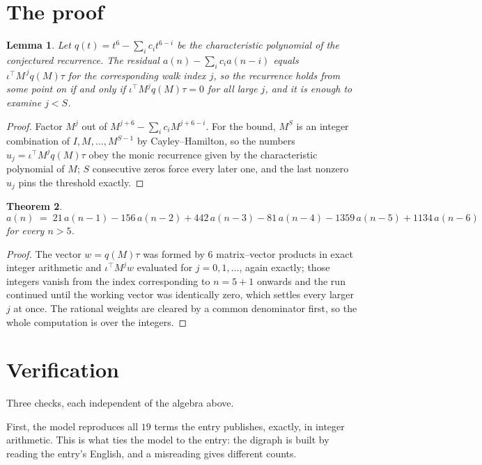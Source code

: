 \documentclass[11pt,a4paper]{article}
\theoremstyle{plain}
\newtheorem{theorem}{Theorem}
\newtheorem{lemma}[theorem]{Lemma}
\theoremstyle{definition}
\begin{document}
\section{The proof}

\begin{lemma}\label{lem:crit}
Let $q(t)=t^{6}-\sum_i c_it^{6-i}$ be the characteristic polynomial of the
conjectured recurrence. The residual $a(n)-\sum_ic_ia(n-i)$ equals
$\iota^{\!\top}M^{\,j}q(M)\tau$ for the corresponding walk index $j$, so the recurrence
holds from some point on if and only if $\iota^{\!\top}M^{j}q(M)\tau=0$ for all large $j$,
and it is enough to examine $j<S$.
\end{lemma}

\begin{proof}
Factor $M^{j}$ out of $M^{j+6}-\sum_ic_iM^{j+6-i}$. For the bound, $M^{S}$
is an integer combination of $I,M,\dots,M^{S-1}$ by Cayley--Hamilton, so the numbers
$u_j=\iota^{\!\top}M^{j}q(M)\tau$ obey the monic recurrence given by the characteristic
polynomial of $M$; $S$ consecutive zeros force every later one, and the last nonzero $u_j$
pins the threshold exactly.
\end{proof}

\begin{theorem}
\[
a(n)\;=\;21\,a(n-1) - 156\,a(n-2) + 442\,a(n-3) - 81\,a(n-4) - 1359\,a(n-5) + 1134\,a(n-6)
\]
for every $n>5$.
\end{theorem}

\begin{proof}
The vector $w=q(M)\tau$ was formed by $6$ matrix--vector products in exact integer
arithmetic and $\iota^{\!\top}M^{j}w$ evaluated for $j=0,1,\dots$, again exactly; those
integers vanish from the index corresponding to $n=5+1$ onwards and the run continued
until the working vector was identically zero, which settles every larger $j$ at once. The
rational weights are cleared by a common denominator first, so the whole computation is over
the integers.
\end{proof}

\section{Verification}

Three checks, each independent of the algebra above.

First, the model reproduces all $19$ terms the entry publishes, exactly, in integer
arithmetic. This is what ties the model to the entry: the digraph is built by reading the
entry's English, and a misreading gives different counts.
\end{document}
